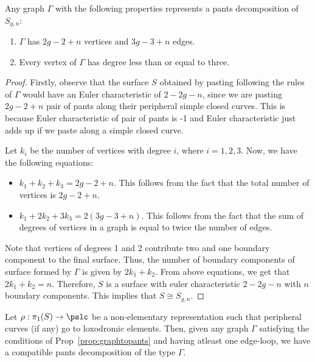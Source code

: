 \begin{prop}\label{prop:graphtopants}
	Any graph $\Gamma$ with the following properties represents a pants decomposition of $S_{g,n}$:
	\begin{enumerate}
		\item $\Gamma$ has $2g-2+n$ vertices and $3g-3+n$ edges.
		\item Every vertex of $\Gamma$ has degree less than or equal to three.
	\end{enumerate}
\end{prop}
\begin{proof}
	Firstly, observe that the surface $S$ obtained by pasting following the rules of $\Gamma$ would have an Euler characteristic of $2-2g-n$, since we are pasting $2g-2+n$ pair of pants along their peripheral simple closed curves. This is because Euler characteristic of pair of pants is -1 and Euler characteristic just adds up if we paste along a simple closed curve.
	
	Let $k_i$ be the number of vertices with degree $i$, where $i=1,2,3$. Now, we have the following equations:
	\begin{itemize}
		\item $k_1 + k_2 + k_3 = 2g - 2 + n$. This follows from the fact that the total number of vertices is $2g - 2 + n$.
		\item $k_1 + 2k_2 + 3k_3 = 2(3g - 3 +n)$. This follows from the fact that the sum of degrees of vertices in a graph is equal to twice the number of edges.
	\end{itemize}
	
	Note that vertices of degrees 1 and 2 contribute two and one boundary component to the final surface. Thus, the number of boundary components of surface formed by $\Gamma$ is given by $2 k_1 + k_2$. From above equations, we get that $2 k_1 + k_2 = n$. Therefore, $S$ is a surface with euler characteristic $2-2g-n$ with $n$ boundary components. This implies that $S \cong S_{g,n}$. 
\end{proof}

\begin{theorem}
	Let $\rho: \pi_1(S) \rightarrow \pslc$ be a non-elementary representation such that peripheral curves (if any) go to loxodromic elements. Then, given any graph $\Gamma$ satisfying the conditions of Prop~\ref{prop:graphtopants} and having atleast one edge-loop, we have a compatible pants decomposition of the type $\Gamma$.
\end{theorem}


